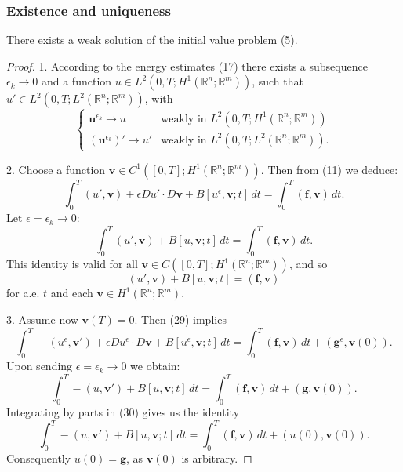 \subsubsection{Existence and uniqueness}

\begin{theorem}
\label{thm:symmetric-hyperbolic-existence-weak-solution}
There exists a weak solution of the initial value problem (5).
\end{theorem}

\begin{proof}
1. According to the energy estimates (17) there exists a subsequence $\epsilon_k \to 0$ and a function $u \in L^2(0,T; H^1(\mathbb{R}^n; \mathbb{R}^m))$, such that $u' \in L^2(0,T; L^2(\mathbb{R}^n; \mathbb{R}^m))$, with
\[
\begin{cases} \mathbf{u}^{\epsilon_k} \to u & \text{weakly in } L^2(0,T; H^1(\mathbb{R}^n; \mathbb{R}^m)) \\ (\mathbf{u}^{\epsilon_k})' \to u' & \text{weakly in } L^2(0,T; L^2(\mathbb{R}^n; \mathbb{R}^m)). \end{cases}
\tag{28}
\]

2. Choose a function $\mathbf{v} \in C^1([0,T]; H^1(\mathbb{R}^n; \mathbb{R}^m))$. Then from (11) we deduce:
\[
\int_0^T (u', \mathbf{v}) + \epsilon Du' \cdot D\mathbf{v} + B[u^\epsilon, \mathbf{v}; t] \, dt = \int_0^T (\mathbf{f}, \mathbf{v}) \, dt.
\tag{29}
\]
Let $\epsilon = \epsilon_k \to 0$:
\[
\int_0^T (u', \mathbf{v}) + B[u, \mathbf{v}; t] \, dt = \int_0^T (\mathbf{f}, \mathbf{v}) \, dt.
\tag{30}
\]
This identity is valid for all $\mathbf{v} \in C([0,T]; H^1(\mathbb{R}^n; \mathbb{R}^m))$, and so
\[
(u', \mathbf{v}) + B[u, \mathbf{v}; t] = (\mathbf{f}, \mathbf{v})
\]
for a.e. $t$ and each $\mathbf{v} \in H^1(\mathbb{R}^n; \mathbb{R}^m)$.

3. Assume now $\mathbf{v}(T) = 0$. Then (29) implies
\[
\int_0^T -(u^\epsilon, \mathbf{v}') + \epsilon Du^\epsilon \cdot D\mathbf{v} + B[u^\epsilon, \mathbf{v}; t] \, dt = \int_0^T (\mathbf{f}, \mathbf{v}) \, dt + (\mathbf{g}^\epsilon, \mathbf{v}(0)).
\]
Upon sending $\epsilon = \epsilon_k \to 0$ we obtain:
\[
\int_0^T -(u, \mathbf{v}') + B[u, \mathbf{v}; t] \, dt = \int_0^T (\mathbf{f}, \mathbf{v}) \, dt + (\mathbf{g}, \mathbf{v}(0)).
\]
Integrating by parts in (30) gives us the identity
\[
\int_0^T -(u, \mathbf{v}') + B[u, \mathbf{v}; t] \, dt = \int_0^T (\mathbf{f}, \mathbf{v}) \, dt + (u(0), \mathbf{v}(0)).
\]
Consequently $u(0) = \mathbf{g}$, as $\mathbf{v}(0)$ is arbitrary.
\end{proof}

